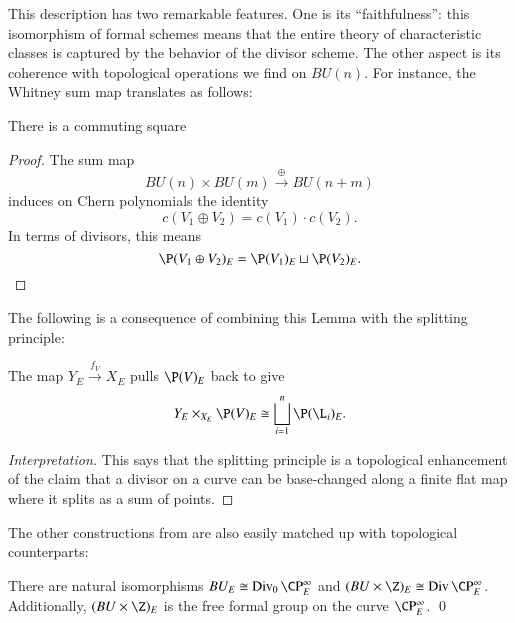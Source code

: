 This description has two remarkable features.  One is its ``faithfulness'': this isomorphism of formal schemes means that the entire theory of characteristic classes is captured by the behavior of the divisor scheme.  The other aspect is its coherence with topological operations we find on $BU(n)$.  For instance, the Whitney sum map translates as follows:

\begin{lemma}\label{WhitneySumOfDivisors}
There is a commuting square
\begin{center}
\end{center}
\end{lemma}
\begin{proof}
The sum map \[BU(n) \times BU(m) \xrightarrow\oplus BU(n+m)\] induces on Chern polynomials the identity~\cite[Theorem 16.2.d]{Switzer} \[c(V_1 \oplus V_2) = c(V_1) \cdot c(V_2).\]  In terms of divisors, this means \[\P(V_1 \oplus V_2)_E = \P(V_1)_E \sqcup \P(V_2)_E. \qedhere\]
\end{proof}

The following is a consequence of combining this Lemma with the splitting principle:

\begin{corollary}
The map $Y_E \xrightarrow{f_V} X_E$ pulls $\P(V)_E$ back to give \[Y_E \times_{X_E} \P(V)_E \cong \bigsqcup_{i=1}^n \P(\L_i)_E.\]
\end{corollary}
\begin{proof}[Interpretation]
This says that the splitting principle is a topological enhancement of the claim that a divisor on a curve can be base-changed along a finite flat map where it splits as a sum of points.
\end{proof}

The other constructions from  are also easily matched up with topological counterparts:

\begin{corollary}\label{ECohomBUIsFree}
There are natural isomorphisms $BU_E \cong \Div_0 \CP^\infty_E$ and $(BU \times \Z)_E \cong \Div \CP^\infty_E$. Additionally, $(BU \times \Z)_E$ is the free formal group on the curve $\CP^\infty_E$. \qed
\end{corollary}

